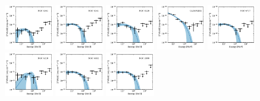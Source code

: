 \documentclass[doublespace,nopageskip]{VTthesis} %
\begin{document}
\begin{appendices}
\begin{figure}
\includegraphics[width=0.19\textwidth]{Figures/Globular/spectra/PLE_spectrum_14.pdf}
\includegraphics[width=0.19\textwidth]{Figures/Globular/spectra/PLE_spectrum_21.pdf}
\includegraphics[width=0.19\textwidth]{Figures/Globular/spectra/PLE_spectrum_20.pdf}
\includegraphics[width=0.19\textwidth]{Figures/Globular/spectra/PLE_spectrum_2.pdf}
\includegraphics[width=0.19\textwidth]{Figures/Globular/spectra/PLE_spectrum_23.pdf}
\includegraphics[width=0.19\textwidth]{Figures/Globular/spectra/PLE_spectrum_10.pdf}
\includegraphics[width=0.19\textwidth]{Figures/Globular/spectra/PLE_spectrum_17.pdf}
\includegraphics[width=0.19\textwidth]{Figures/Globular/spectra/PLE_spectrum_5.pdf}

\end{figure}
\end{appendices}
\end{document}
